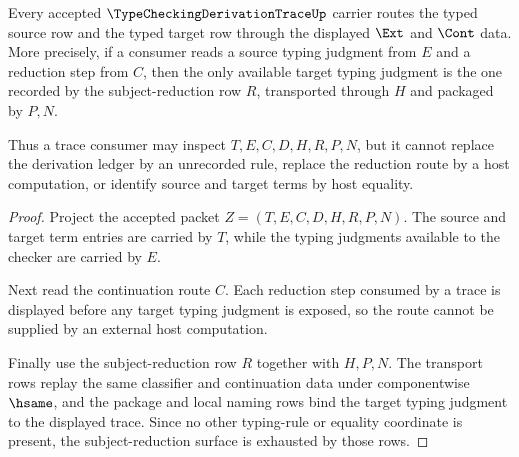 \begin{theorem}
\label{thm:type-checking-derivation-trace-subject-reduction-surface}
Every accepted $\TypeCheckingDerivationTraceUp$ carrier routes the typed source row and the typed target row through the displayed $\Ext$ and $\Cont$ data. More precisely, if a consumer reads a source typing judgment from $E$ and a reduction step from $C$, then the only available target typing judgment is the one recorded by the subject-reduction row $R$, transported through $H$ and packaged by $P,N$.

Thus a trace consumer may inspect $T,E,C,D,H,R,P,N$, but it cannot replace the derivation ledger by an unrecorded rule, replace the reduction route by a host computation, or identify source and target terms by host equality.
\end{theorem}
\begin{proof}
Project the accepted packet $Z=(T,E,C,D,H,R,P,N)$. The source and target term entries are carried by $T$, while the typing judgments available to the checker are carried by $E$.

Next read the continuation route $C$. Each reduction step consumed by a trace is displayed before any target typing judgment is exposed, so the route cannot be supplied by an external host computation.

Finally use the subject-reduction row $R$ together with $H,P,N$. The transport rows replay the same classifier and continuation data under componentwise $\hsame$, and the package and local naming rows bind the target typing judgment to the displayed trace. Since no other typing-rule or equality coordinate is present, the subject-reduction surface is exhausted by those rows.
\end{proof}

